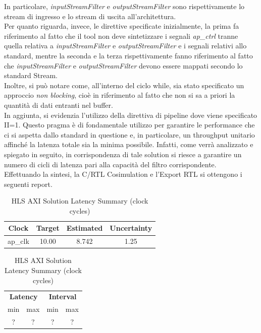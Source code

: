 In particolare, \textit{inputStreamFilter} e \textit{outputStreamFilter} sono rispettivamente lo stream di ingresso e lo stream di uscita all'architettura. 
\\
Per quanto riguarda, invece, le direttive specificate inizialmente, la prima fa riferimento al fatto che il tool non deve sintetizzare i segnali \textit{ap\_ctrl} tranne quella relativa a \textit{inputStreamFilter} e \textit{outputStreamFilter} e i segnali relativi allo standard, mentre la seconda e la terza rispettivamente fanno riferimento al fatto che \textit{inputStreamFilter} e \textit{outputStreamFilter} devono essere mappati secondo lo standard Stream.
\\
Inoltre, si può notare come, all'interno del ciclo while, sia stato specificato un approccio \textit{non blocking}, cioè in riferimento al fatto che non si sa a priori la quantità di dati entranti nel buffer.
\\
In aggiunta, si evidenzia l'utilizzo della direttiva di pipeline dove viene specificato II=1. Questo pragma è di fondamentale utilizzo per garantire le performance che ci si aspetta dallo standard in questione e, in particolare, un throughput unitario affinché la latenza totale sia la minima possibile. Infatti, come verrà analizzato e spiegato in seguito, in corrispondenza di tale solution si riesce a garantire un numero di cicli di latenza pari alla capacità del filtro corrispondente.
\\
Effettuando la sintesi, la C/RTL Cosimulation e l'Export RTL si ottengono i seguenti report.

\begin{table}[H]
	\centering
	\begin{minipage}[t]{0.45\linewidth}
		\centering
		\begin{tabular}{|c|c|c|c|}
			\hline
			\textbf{Clock} & \textbf{Target} & \textbf{Estimated} & \textbf{Uncertainty} \\
			\hline
			ap\_clk & 10.00 & 8.742 & 1.25 \\
			\hline
		\end{tabular}
		\caption{HLS AXI Solution Timing Summary (ns)}
		\label{tab:hls-axi-solution-timing-summary}
	\end{minipage}
	\hfill
	\begin{minipage}[t]{0.45\linewidth}
		\centering
		\begin{tabular}{|c|c|c|c|}
			\hline
			\multicolumn{2}{|c|}{\textbf{Latency}} & \multicolumn{2}{|c|}{\textbf{Interval}} \\
			min & max & min & max \\
			\hline
			? & ? & ? & ? \\
			\hline
		\end{tabular}
		\caption{HLS AXI Solution Latency Summary (clock cycles)}
		\label{tab:hls-axi-solution-latency-summary}
	\end{minipage}
\end{table}

